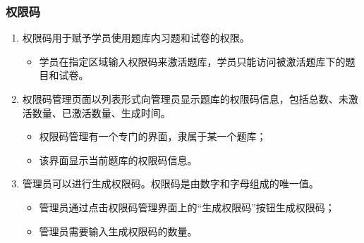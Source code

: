 \documentclass{article}
\begin{document}
    \subsubsection{权限码}
    \begin{enumerate}
        \item 权限码用于赋予学员使用题库内习题和试卷的权限。
        \begin{itemize}
            \item 学员在指定区域输入权限码来激活题库，学员只能访问被激活题库下的题目和试卷。
        \end{itemize}

        \item 权限码管理页面以列表形式向管理员显示题库的权限码信息，包括总数、未激活数量、已激活数量、生成时间。
        \begin{itemize}
            \item 权限码管理有一个专门的界面，隶属于某一个题库；
            \item 该界面显示当前题库的权限码信息。
        \end{itemize}

        \item 管理员可以进行生成权限码。权限码是由数字和字母组成的唯一值。
        \begin{itemize}
            \item 管理员通过点击权限码管理界面上的“生成权限码”按钮生成权限码；
            \item 管理员需要输入生成权限码的数量。
        \end{itemize}

    \end{enumerate}
\end{document}

